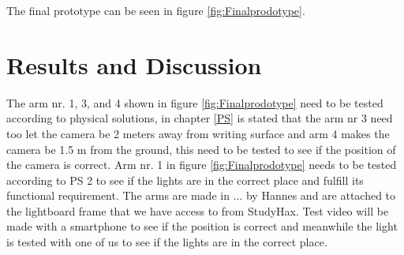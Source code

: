 \documentclass[a4paper]{jpconf}
\begin{document}
	The final prototype can be seen in figure \ref{fig:Finalprodotype}.
	
	\section{Results and Discussion}
	
	
	The arm nr. 1, 3, and 4  shown in figure \ref{fig:Finalprodotype} need to be tested according to physical solutions, in chapter \ref{PS} is stated that the arm nr 3 need too let the camera be 2 meters away from writing surface and arm 4 makes the camera be 1.5 m from the ground, this need to be tested to see if the position of the camera is correct. Arm nr. 1  in figure \ref{fig:Finalprodotype} needs to be tested according to PS 2 to see if the lights are in the correct place and fulfill its functional requirement. 
	The arms are made in ... by Hannes and are attached to the lightboard frame that we have access to from StudyHax.  Test video will be made with a smartphone to see if the position is correct and meanwhile the light is tested with one of us to see if the lights are in the correct place.
	
	
\end{document}
